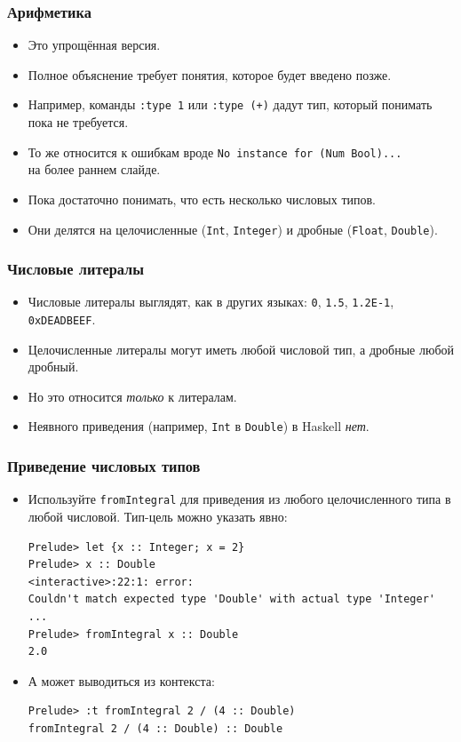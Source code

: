 \documentclass[10pt]{beamer}
\begin{document}
\begin{frame}[fragile]
\frametitle{Арифметика}
\begin{itemize}
    \item Это упрощённая версия.
    \item Полное объяснение требует понятия, которое будет введено позже. 
    \item Например, команды \lstinline|:type 1| или \lstinline|:type (+)| дадут тип, который понимать пока не требуется. 
    \item То же относится к ошибкам вроде \lstinline[breaklines=false]|No instance for (Num Bool)...|\\ на более раннем слайде.
    \item Пока достаточно понимать, что есть несколько числовых типов.
    \item Они делятся на целочисленные (\lstinline|Int|, \lstinline|Integer|) и дробные (\lstinline|Float|, \lstinline|Double|).
\end{itemize}
\end{frame}

\begin{frame}[fragile]
\frametitle{Числовые литералы}
\begin{itemize}
    \item Числовые литералы выглядят, как в других языках: \lstinline|0|, \lstinline|1.5|, \lstinline|1.2E-1|, \lstinline|0xDEADBEEF|. 
    \item Целочисленные литералы могут иметь любой числовой тип, а дробные любой дробный.
    \item Но это относится \emph{только} к литералам. 
    \item Неявного приведения (например, \lstinline|Int| в \lstinline|Double|) в Haskell \emph{нет}. 
\end{itemize}
\end{frame}

\begin{frame}[fragile]
\frametitle{Приведение числовых типов}
\begin{itemize}
    \item Используйте \lstinline|fromIntegral| для приведения из любого целочисленного типа в любой числовой. Тип-цель можно указать явно:
\begin{lstlisting}
Prelude> let {x :: Integer; x = 2}
Prelude> x :: Double
<interactive>:22:1: error:
Couldn't match expected type 'Double' with actual type 'Integer' ...
Prelude> fromIntegral x :: Double
2.0
\end{lstlisting}    
    \item А может выводиться из контекста:
\begin{lstlisting}
Prelude> :t fromIntegral 2 / (4 :: Double)
fromIntegral 2 / (4 :: Double) :: Double
\end{lstlisting}    
\end{itemize}
\end{frame}
\end{document}
